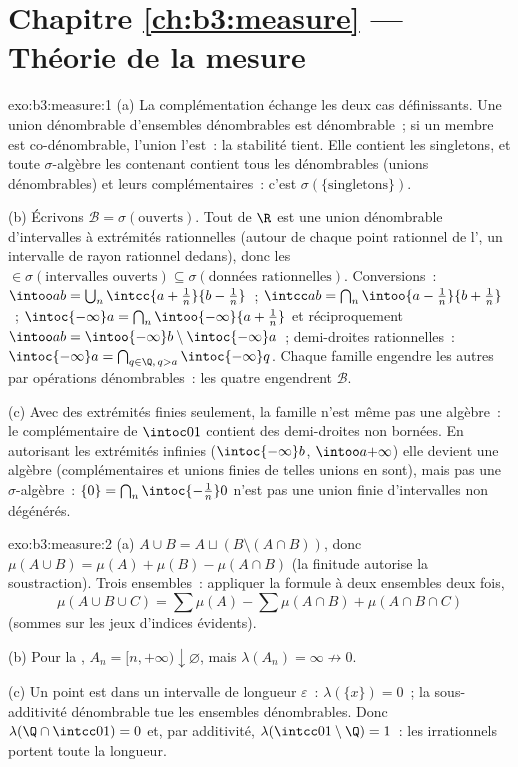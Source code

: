 \section*{Chapitre \ref{ch:b3:measure} --- Théorie de la mesure}

\begin{solution}{exo:b3:measure:1}
(a) La complémentation échange les deux cas définissants. Une
union dénombrable d'ensembles dénombrables est dénombrable~; si
un membre est co-dénombrable, l'union l'est~: la stabilité
tient. Elle contient les singletons, et toute $\sigma$-algèbre
les contenant contient tous les dénombrables (unions
dénombrables) et leurs complémentaires~: c'est
$\sigma(\{\text{singletons}\})$.

(b) Écrivons $\mathcal B = \sigma(\text{ouverts})$. Tout
 de $\R$ est une union dénombrable d'intervalles 
à extrémités rationnelles (autour de chaque point rationnel de
l', un intervalle de rayon rationnel  dedans),
donc les  $\in \sigma(\text{intervalles ouverts})
\subseteq \sigma(\text{données rationnelles})$. Conversions~:
$\intoo ab = \bigcup_n\intcc{a + \frac1n}{b - \frac1n}$~;
$\intcc ab = \bigcap_n \intoo{a - \frac1n}{b + \frac1n}$~;
$\intoc{-\infty}a = \bigcap_n \intoo{-\infty}{a + \frac1n}$
et réciproquement $\intoo ab = \intoo{-\infty}b \setminus
\intoc{-\infty}a$~; demi-droites rationnelles~:
$\intoc{-\infty}a = \bigcap_{q \in \Q,\, q >
a}\intoc{-\infty}q$. Chaque famille engendre les autres par
opérations dénombrables~: les quatre engendrent $\mathcal B$.

(c) Avec des extrémités finies seulement, la famille n'est
même pas une algèbre~: le complémentaire de $\intoc01$
contient des demi-droites non bornées. En autorisant les
extrémités infinies ($\intoc{-\infty}b$, $\intoo a{+\infty}$)
elle devient une algèbre (complémentaires et unions finies de
telles unions en sont), mais pas une $\sigma$-algèbre~:
$\{0\} = \bigcap_n\intoc{-\frac1n}0$ n'est pas une union finie
d'intervalles non dégénérés.
\end{solution}

\begin{solution}{exo:b3:measure:2}
(a) $A \cup B = A \sqcup (B \setminus (A\cap B))$, donc
$\mu(A\cup B) = \mu(A) + \mu(B) - \mu(A\cap B)$ (la finitude
autorise la soustraction). Trois ensembles~: appliquer la
formule à deux ensembles deux fois,
\[
\mu(A\cup B\cup C) = \sum\mu(A) - \sum\mu(A\cap B) +
\mu(A\cap B\cap C)
\]
(sommes sur les jeux d'indices évidents).

(b) Pour la , $A_n = [n, +\infty)
\downarrow \varnothing$, mais $\lambda(A_n) = \infty \not\to
0$.

(c) Un point est  dans un intervalle de longueur
$\varepsilon$~: $\lambda(\{x\}) = 0$~; la sous-additivité
dénombrable tue les ensembles dénombrables. Donc $\lambda(\Q
\cap \intcc01) = 0$ et, par additivité,
$\lambda(\intcc01\setminus\Q) = 1$~: les irrationnels portent
toute la longueur.
\end{solution}

